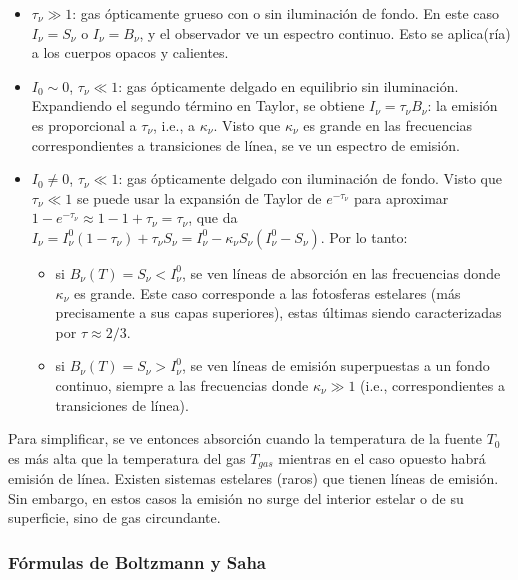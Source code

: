 \documentclass[11pt,letterpaper]{article}
\begin{document}
\begin{itemize}
    \item \(\tau_\nu \gg 1\): gas ópticamente grueso con o sin iluminación de fondo. En este caso \(I_\nu = S_\nu\) o \(I_\nu = B_\nu\), y el observador ve un espectro continuo. Esto se aplica(ría) a los cuerpos opacos y calientes.
    \item \(I_0 \sim 0\), \(\tau_\nu \ll 1\): gas ópticamente delgado en equilibrio sin iluminación. Expandiendo el segundo término en Taylor, se obtiene \(I_\nu = \tau_\nu B_\nu\): la emisión es proporcional a \(\tau_\nu\), i.e., a \(\kappa_\nu\). Visto que \(\kappa_\nu\) es grande en las frecuencias correspondientes a transiciones de línea, se ve un espectro de emisión.
    \item \(I_0 \neq 0\), \(\tau_\nu \ll 1\): gas ópticamente delgado con iluminación de fondo. Visto que \(\tau_\nu \ll 1\) se puede usar la expansión de Taylor de \(e^{-\tau_\nu}\) para aproximar \(1 - e^{-\tau_\nu} \approx 1 - 1 + \tau_\nu = \tau_\nu\), que da \(I_\nu = I_\nu^0(1 - \tau_\nu) + \tau_\nu S_\nu = I_\nu^0 - \kappa_\nu S_\nu (I_\nu^0 - S_\nu)\). Por lo tanto:
    \begin{itemize}
        \item si \(B_\nu(T) = S_\nu < I_\nu^0\), se ven líneas de absorción en las frecuencias donde \(\kappa_\nu\) es grande. Este caso corresponde a las fotosferas estelares (más precisamente a sus capas superiores), estas últimas siendo caracterizadas por \(\tau \approx 2/3\).
        \item si \(B_\nu(T) = S_\nu > I_\nu^0\), se ven líneas de emisión superpuestas a un fondo continuo, siempre a las frecuencias donde \(\kappa_\nu \gg 1\) (i.e., correspondientes a transiciones de línea).
    \end{itemize}
\end{itemize}

Para simplificar, se ve entonces absorción cuando la temperatura de la fuente \(T_0\) es más alta que la temperatura del gas \(T_{gas}\) mientras en el caso opuesto habrá emisión de línea. Existen sistemas estelares (raros) que tienen líneas de emisión. Sin embargo, en estos casos la emisión no surge del interior estelar o de su superficie, sino de gas circundante.

\subsubsection{Fórmulas de Boltzmann y Saha}
\end{document}
